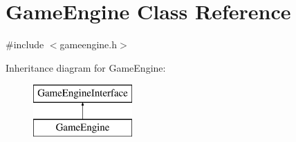 \hypertarget{classGameEngine}{\section{Game\-Engine Class Reference}
\label{classGameEngine}
}


{\ttfamily \#include $<$gameengine.\-h$>$}

Inheritance diagram for Game\-Engine\-:\begin{figure}[H]
\begin{center}
\leavevmode
\includegraphics[height=2.000000cm]{classGameEngine}
\end{center}
\end{figure}
